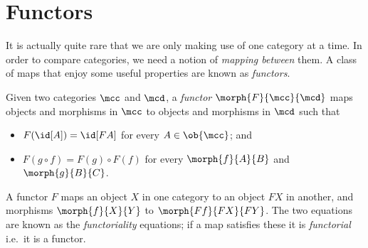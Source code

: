 \section{Functors}\label{sec:functors}

It is actually quite rare that we are only making use of one category at a time.
In order to compare categories, we need a notion of \emph{mapping between} them.
A class of maps that enjoy some useful properties are known as \emph{functors}.

\begin{definition}[Functor]
    Given two categories \(\mcc\) and \(\mcd\), a \emph{functor} \(
    \morph{F}{\mcc}{\mcd}
    \) maps objects and morphisms in \(\mcc\) to objects and morphisms in
    \(\mcd\) such that
    \begin{itemize}
        \item \(F(\id[A]) = \id[FA]\) for every \(A \in \ob{\mcc}\); and
        \item \(F(g \circ f) = F(g) \circ F(f)\) for every \(\morph{f}{A}{B}\)
              and \(\morph{g}{B}{C}\).
    \end{itemize}

    \begin{center}
        \qquad
    \end{center}
\end{definition}

A functor \(F\) maps an object \(X\) in one category to an object \(FX\) in
another, and morphisms \(\morph{f}{X}{Y}\) to \(\morph{Ff}{FX}{FY}\).
The two equations are known as the \emph{functoriality} equations; if a map
satisfies these it is \emph{functorial} i.e.\ it is a functor.

